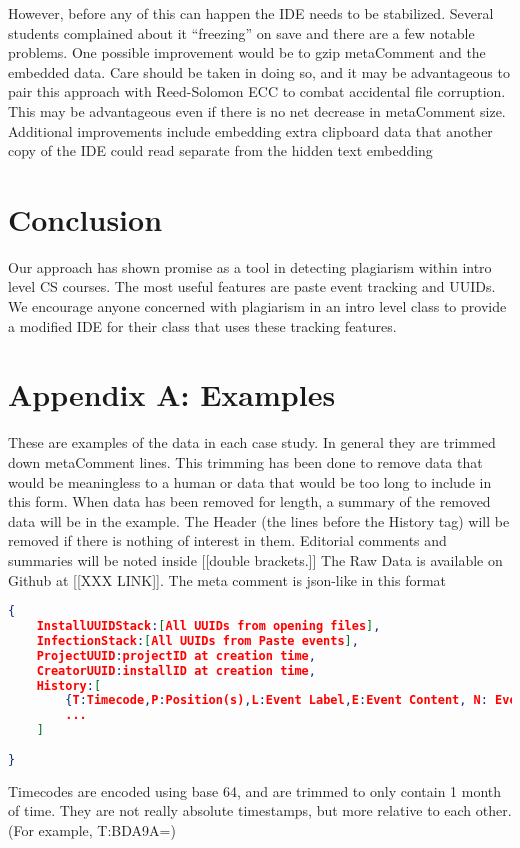 \documentclass[12pt,final,thesis,actual]{uhthesis}
\newcommand{\n}{\hfill\break}
\newcommand{\metaComment}{metaComment\xspace}
\begin{document}
However, before any of this can happen the IDE needs to be stabilized.  Several students complained about it ``freezing'' on save and there are a few notable problems.  One possible improvement would be to gzip \metaComment and the embedded data.  Care should be taken in doing so, and it may be advantageous to pair this approach with Reed-Solomon ECC to combat accidental file corruption.  This may be advantageous even if there is no net decrease in \metaComment size.  Additional improvements include embedding extra clipboard data that another copy of the IDE could read separate from the hidden text embedding
\n\chapter{\textbf{Conclusion}}
Our approach has shown promise as a tool in detecting plagiarism within intro level CS courses.  The most useful features are paste event tracking and UUIDs.  We encourage anyone concerned with plagiarism in an intro level class to provide a modified IDE for their class that uses these tracking features.

{}
 
\appendix
\chapter{\textbf{Appendix A: Examples}}
These are examples of the data in each case study.  In general they are trimmed down \metaComment lines.  This trimming has been done to remove data that would be meaningless to a human or data that would be too long to include in this form.  When data has been removed for length, a summary of the removed data will be in the example.  The Header (the lines before the History tag) will be removed if there is nothing of interest in them.  Editorial comments and summaries will be noted inside [[double brackets.]]
The Raw Data is available on Github at [[XXX LINK]].
The meta comment is json-like in this format
\begin{lstlisting}[language=JSON]
{
	InstallUUIDStack:[All UUIDs from opening files],
	InfectionStack:[All UUIDs from Paste events],
	ProjectUUID:projectID at creation time,
	CreatorUUID:installID at creation time,
	History:[
		{T:Timecode,P:Position(s),L:Event Label,E:Event Content, N: Event Notes},
		...
	]
	
}
\end{lstlisting}
Timecodes are encoded using base 64, and are trimmed to only contain 1 month of time.  They are not really absolute timestamps, but more relative to each other. (For example, T:BDA9A=)
\end{document}
